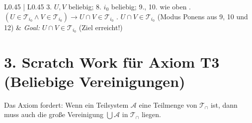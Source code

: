 \documentclass{article}
\begin{document}
\begin{center}
\begin{tabular}{ L{0.45\textwidth} | L{0.45\textwidth} }
3. $U,V$ beliebig; 8. $i_0$ beliebig; 9., 10. wie oben . $(U \in \mathcal{T}_{i_0} \land V \in \mathcal{T}_{i_0}) \rightarrow U \cap V \in \mathcal{T}_{i_0}$ . $U \cap V \in \mathcal{T}_{i_0}$ \quad (Modus Ponens aus 9, 10 und 12) &
\emph{Goal:} $U \cap V \in \mathcal{T}_{i_0}$ \newline
\newline
\checkmark \quad (Ziel erreicht!) \\
\bottomrule
\end{tabular}
\end{center}

\newpage

\section*{3. Scratch Work für Axiom T3 (Beliebige Vereinigungen)}

Das Axiom fordert: Wenn ein Teilsystem $\mathcal{A}$ eine Teilmenge von $\mathcal{T}_{\cap}$ ist, dann muss auch die große Vereinigung $\bigcup \mathcal{A}$ in $\mathcal{T}_{\cap}$ liegen.
\end{document}
